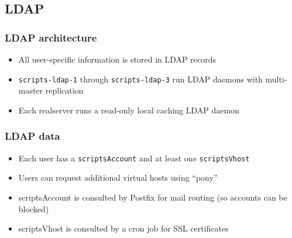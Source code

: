 \subsection{LDAP}

\begin{frame}
  \frametitle{LDAP architecture}

  \begin{itemize}
  \item All user-specific information is stored in LDAP records
  \item \texttt{scripts-ldap-1} through \texttt{scripts-ldap-3} run LDAP daemons with multi-master replication
  \item Each realserver runs a read-only local caching LDAP daemon
  \end{itemize}
\end{frame}

\begin{frame}
  \frametitle{LDAP data}

  \begin{itemize}
  \item Each user has a \texttt{scriptsAccount} and at least one
    \texttt{scriptsVhost}
  \item Users can request additional virtual hosts using ``pony''
  \item scriptsAccount is consulted by Postfix for mail routing (so accounts can be blocked)
  \item scriptsVhost is consulted by a cron job for SSL certificates
  \end{itemize}
\end{frame}
